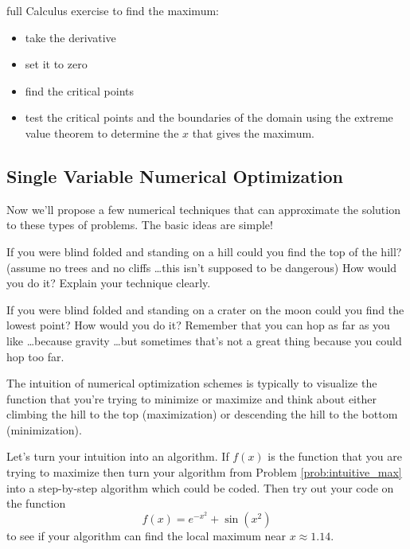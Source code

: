 \begin{problem}
\begin{enumerate}
            full Calculus exercise to find the maximum:
            \begin{itemize}
                \item take the derivative
                \item set it to zero
                \item find the critical points
                \item test the critical points and the boundaries of the domain using the
                    extreme value theorem to determine the $x$ that gives the maximum.
            \end{itemize}
    \end{enumerate}
\end{problem}

\newpage\subsection{Single Variable Numerical Optimization}

Now we'll propose a few numerical techniques that can approximate the solution to these
types of problems.  The basic ideas are simple!

\begin{problem}\label{prob:intuitive_max}
    If you were blind folded and standing on a hill could you find the top of the hill?
    (assume no trees and no cliffs \ldots this isn't supposed to be dangerous)  How would
    you do it?  Explain your technique clearly.
\end{problem}

\begin{problem}
    If you were blind folded and standing on a crater on the moon could you find the
    lowest point?  How would you do it?  Remember that you can hop as far as you like
    \ldots because gravity \ldots but sometimes that's not a great thing because you could
    hop too far.
\end{problem}

The intuition of numerical optimization schemes is typically to visualize the function that
you're trying to minimize or maximize and think about either climbing the hill to the top
(maximization) or descending the hill to the bottom (minimization).  

\begin{problem}
    Let's turn your intuition into an algorithm.  If $f(x)$ is the function that you are
    trying to maximize then turn your algorithm from Problem \ref{prob:intuitive_max} into
    a step-by-step algorithm which could be coded. Then try out your code on the function 
    \[ f(x) = e^{-x^2} + \sin(x^2) \]
    to see if your algorithm can find the local maximum near $x \approx 1.14$.
\end{problem}

